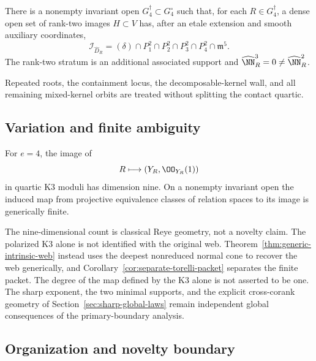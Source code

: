 \begin{theorem}
\label{thm:main-coranktwo}
There is a nonempty invariant open
\(G_4^\dagger\subset G_4^\circ\) such that, for each
\(R\in G_4^\dagger\), a dense open set of rank-two images
\(H\subset V\) has, after an etale extension and smooth auxiliary
coordinates,
\begin{equation}\label{eq:main-coranktwo}
 \mathcal I_{\widehat D_R}
 =
 (\delta)\cap P_1^2\cap P_2^2\cap P_3^2\cap P_4^2
 \cap\mathfrak m^5.
\end{equation}
The rank-two stratum is an additional associated support and
\(\widehat\NN_R^3=0\ne\widehat\NN_R^2\).
\end{theorem}

Repeated roots, the containment locus, the decomposable-kernel wall,
and all remaining mixed-kernel orbits are treated without splitting
the contact quartic.

\subsection{Variation and finite ambiguity}

\begin{theorem}
\label{thm:main-moduli}
For \(e=4\), the image of
\[
 R\longmapsto(Y_R,\OO_{Y_R}(1))
\]
in quartic K3 moduli has dimension nine.  On a nonempty invariant
open the induced map from projective equivalence classes of relation
spaces to its image is generically finite.
\end{theorem}

The nine-dimensional count is classical Reye geometry, not a novelty
claim.  The polarized K3 alone is not identified with the original web.
Theorem~\ref{thm:generic-intrinsic-web} instead uses the deepest
nonreduced normal cone to recover the web generically, and
Corollary~\ref{cor:separate-torelli-packet} separates the finite
packet.  The degree of the map defined by the K3 alone is not asserted
to be one.  The sharp exponent, the two minimal supports, and the
explicit cross-corank geometry of
Section~\ref{sec:sharp-global-laws} remain independent global
consequences of the primary-boundary analysis.

\subsection{Organization and novelty boundary}

